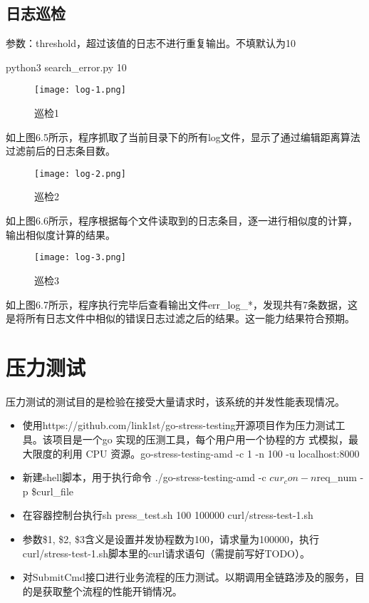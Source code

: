 \subsection{日志巡检}

参数：threshold，超过该值的日志不进行重复输出。不填默认为10

python3 search\_error.py 10

\begin{figure}[H]
    \centering
    \texttt{[image: log-1.png]}
    \caption{巡检1}
    \label{fig:6-4-1}
\end{figure}
如上图6.5所示，程序抓取了当前目录下的所有log文件，显示了通过编辑距离算法过滤前后的日志条目数。

\begin{figure}[H]
    \centering
    \texttt{[image: log-2.png]}
    \caption{巡检2}
    \label{fig:6-4-2}
\end{figure}
如上图6.6所示，程序根据每个文件读取到的日志条目，逐一进行相似度的计算，输出相似度计算的结果。

\begin{figure}[H]
    \centering
    \texttt{[image: log-3.png]}
    \caption{巡检3}
    \label{fig:6-4-3}
\end{figure}
如上图6.7所示，程序执行完毕后查看输出文件err\_log\_*，发现共有7条数据，这是将所有日志文件中相似的错误日志过滤之后的结果。这一能力结果符合预期。

%


\section{压力测试}
压力测试的测试目的是检验在接受大量请求时，该系统的并发性能表现情况。

\begin{itemize}
    \item 使用https://github.com/link1st/go-stress-testing开源项目作为压力测试工具。该项目是一个go 实现的压测工具，每个用户用一个协程的方
式模拟，最大限度的利用 CPU 资源。go-stress-testing-amd -c 1 -n 100 -u localhost:8000
    \item 新建shell脚本，用于执行命令 ./go-stress-testing-amd -c $cur_con -n $req\_num -p \$curl\_file
    \item 在容器控制台执行sh press\_test.sh 100 100000 curl/stress-test-1.sh\cite{zw5}
    \item 参数\$1, \$2, \$3含义是设置并发协程数为100，请求量为100000，执行curl/stress-test-1.sh脚本里的curl请求语句（需提前写好TODO）。
    \item 对SubmitCmd接口进行业务流程的压力测试。以期调用全链路涉及的服务，目的是获取整个流程的性能开销情况。
\end{itemize}

